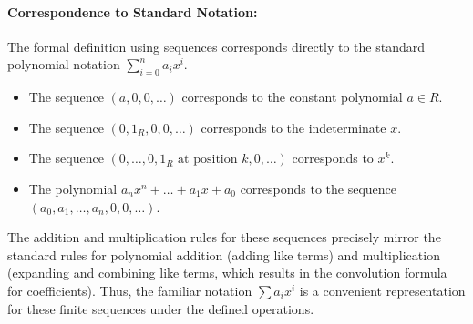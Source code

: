 \documentclass[oneside]{book}
\begin{document}
\paragraph{Correspondence to Standard Notation:}
The formal definition using sequences corresponds directly to the standard polynomial notation $\sum_{i=0}^n a_i x^i$.
\begin{itemize}
	\item The sequence $(a, 0, 0, \dots)$ corresponds to the constant polynomial $a \in R$.
	\item The sequence $(0, 1_R, 0, 0, \dots)$ corresponds to the indeterminate $x$.
	\item The sequence $(0, \dots, 0, 1_R \text{ at position } k, 0, \dots)$ corresponds to $x^k$.
	\item The polynomial $a_n x^n + \dots + a_1 x + a_0$ corresponds to the sequence $(a_0, a_1, \dots, a_n, 0, 0, \dots)$.
\end{itemize}
The addition and multiplication rules for these sequences precisely mirror the standard rules for polynomial addition (adding like terms) and multiplication (expanding and combining like terms, which results in the convolution formula for coefficients). Thus, the familiar notation $\sum a_i x^i$ is a convenient representation for these finite sequences under the defined operations.

\end{document}
